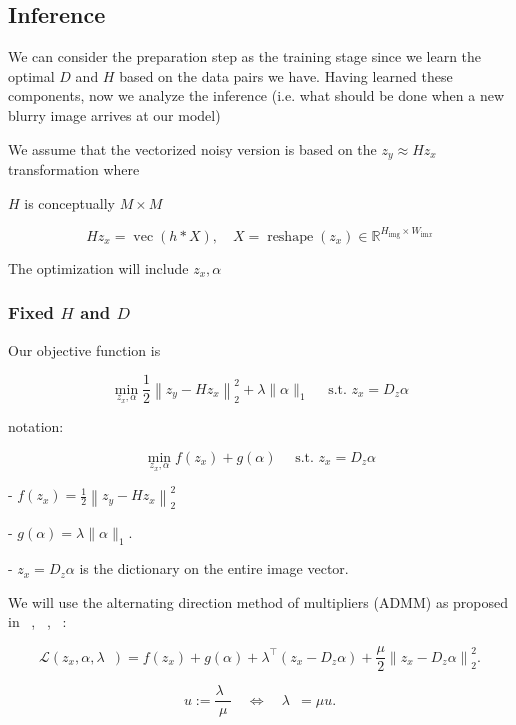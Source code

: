 \documentclass{article}
\theoremstyle{definition}
\begin{document}
\subsection{Inference }

We can consider the preparation step as the training stage since we learn the optimal $D$ and $H$ based on the data pairs we have. Having learned these components, now we analyze the inference (i.e. what should be done when a new blurry image arrives at our model)

We assume that the vectorized noisy version is based on the $z_y \approx H z_x$ transformation where 

$H$ is conceptually $M \times M$

$$
H z_x=\operatorname{vec}(h * X), \quad X=\operatorname{reshape}\left(z_x\right) \in \mathbb{R}^{H_{\mathrm{img}} \times W_{\mathrm{im} x}}
$$



The optimization will include $z_x,\alpha$ 

\subsubsection{Fixed $H$ and $D$}

Our objective function is

$$
\min _{z_x, \alpha} \frac{1}{2}\left\|z_y-H z_x\right\|_2^2+\lambda\|\alpha\|_1 \quad \text { s.t. } z_x=D_z \alpha
$$




notation:


$$
\min _{z_x, \alpha} f\left(z_x\right)+g(\alpha) \quad \text { s.t. } z_x=D_z \alpha
$$


- $f\left(z_x\right)=\frac{1}{2}\left\|z_y-H z_x\right\|_2^2$


- $g(\alpha)=\lambda\|\alpha\|_1$.

- $z_x=D_z \alpha$ is the dictionary on the entire image vector. 





We will use the alternating direction method of multipliers (ADMM) as proposed in ~\cite{ClassicBlur}, ~\cite{ADMM}, ~\cite{ScaledADMM}:

$$
\mathcal{L}\left(z_x, \alpha, \lambda_{\text { }}\right)=f\left(z_x\right)+g(\alpha)+\lambda_{\text { }}^{\top}\left(z_x-D_z \alpha\right)+\frac{\mu}{2}\left\|z_x-D_z \alpha\right\|_2^2 .
$$

$$
u:=\frac{\lambda_{\text { }}}{\mu} \quad \Longleftrightarrow \quad \lambda_{\text { }}=\mu u .
$$
\end{document}
